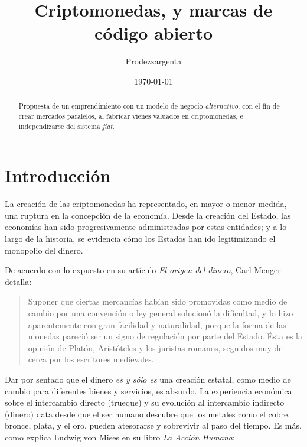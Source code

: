 \documentclass[12pt,a4paper]{article}
\author{Prodezzargenta}
\title{Criptomonedas, y marcas de código abierto}
\date{\today}
\begin{document}
\maketitle

\begin{abstract}
Propuesta de un emprendimiento con un modelo de negocio \textit{alternativo}, con el fin de crear mercados paralelos, al fabricar vienes valuados en criptomonedas, e independizarse del sistema \textit{fiat}.
\end{abstract}
	
\tableofcontents

\section{Introducción}
La creación de las criptomonedas ha representado, en mayor o menor medida, una ruptura en la concepción de la economía. Desde la creación del Estado, las economías han sido progresivamente administradas por estas entidades; y a lo largo de la historia, se evidencia cómo los Estados han ido legitimizando el monopolio del dinero.

De acuerdo con lo expuesto en su artículo \textit{El origen del dinero}, Carl Menger detalla:

\begin{quotation}
Suponer que ciertas mercancías habían sido promovidas como medio de cambio por una convención o ley general solucionó la dificultad, y lo hizo aparentemente con gran facilidad y naturalidad, porque la forma de las monedas pareció ser un signo de regulación por parte del Estado. Ésta es la opinión de Platón, Aristóteles y los juristas romanos, seguidos muy de cerca por los escritores medievales. \cite[págs. 240-241]{menger:origen}
\end{quotation}

Dar por sentado que el dinero \textit{es y sólo es} una creación estatal, como medio de cambio para diferentes bienes y servicios, es absurdo. La experiencia económica sobre el intercambio directo (trueque) y su evolución al intercambio indirecto (dinero) data desde que el ser humano descubre que los metales como el cobre, bronce, plata, y el oro, pueden atesorarse y sobrevivir al paso del tiempo. Es más, como explica Ludwig von Mises en su libro \textit{La Acción Humana}:
\end{document}
